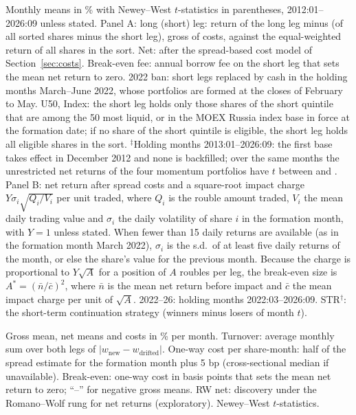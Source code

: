 \documentclass[11pt]{article}
\newcommand{\tabnote}[1]{\par\vspace{3pt}\begin{minipage}{\linewidth}\footnotesize\setstretch{1.0}#1\end{minipage}}
\newcommand{\RW}{Romano--Wolf}
\begin{document}
\begin{table}[!htbp]
\centering\small
\caption{Implementability of the survivors (exploratory)}\label{tab:implement}
\resizebox{\linewidth}{!}{}\par\medskip
\resizebox{\linewidth}{!}{}
\tabnote{Monthly means in \% with Newey--West $t$-statistics in parentheses, 2012:01--2026:09 unless stated. Panel A:
long (short) leg: return of the long leg minus (of all sorted shares minus the short leg), gross of costs, against the
equal-weighted return of all shares in the sort. Net: after the spread-based cost model of Section~\ref{sec:costs}.
Break-even fee: annual borrow fee on the short leg that sets the mean net return to zero. 2022 ban: short legs replaced
by cash in the holding months March--June 2022, whose portfolios are formed at the closes of February to May. U50, Index: the short leg holds only those shares of the short quintile
that are among the 50 most liquid, or in the MOEX Russia index base in force at the formation date; if no share of the short quintile is
eligible, the short leg holds all eligible shares in the sort. $^{\ddagger}$Holding months 2013:01--2026:09: the first base takes
effect in December 2012 and none is backfilled; over the same months the unrestricted net returns of the four momentum
portfolios have $t$ between \val{IdxWinTmin} and \val{IdxWinTmax}. Panel B: net return after
spread costs and a square-root impact charge $Y\sigma_i\sqrt{Q_i/V_i}$ per unit traded, where $Q_i$ is the rouble
amount traded, $V_i$ the mean daily trading value and $\sigma_i$ the daily volatility of share $i$ in the formation
month, with $Y=1$ unless stated. When fewer than 15 daily returns are available (as in the formation month March 2022),
$\sigma_i$ is the s.d.\ of at least five daily returns of the month, or else the share's value for the previous month. Because the charge is proportional to $Y\sqrt{A}$ for a
position of $A$ roubles per leg, the break-even size is $A^\ast=(\bar n/\bar c)^2$, where $\bar n$ is the mean net return
before impact and $\bar c$ the mean impact charge per unit of $\sqrt{A}$. 2022--26: holding months 2022:03--2026:09. STR$^{\dagger}$: the short-term continuation strategy (winners minus
losers of month $t$).}
\end{table}

\begin{table}[!htbp]
\centering\small
\caption{Trading costs}\label{tab:costs}
\resizebox{\linewidth}{!}{}
\tabnote{Gross mean, net means and costs in \% per month. Turnover: average monthly sum over both legs of
$|w_{\text{new}}-w_{\text{drifted}}|$. One-way cost per share-month: half of the \citet{abdi2017simple} spread estimate
for the formation month plus 5 bp (cross-sectional median if unavailable). Break-even: one-way cost in basis points that
sets the mean net return to zero; ``--'' for negative gross means. RW net: discovery under the \RW{} rung for net
returns (exploratory). Newey--West $t$-statistics.}
\end{table}
\end{document}
